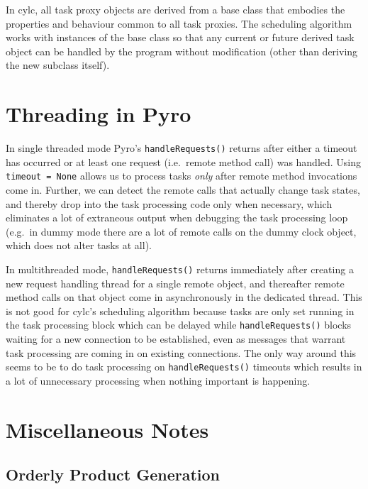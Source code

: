 \documentclass[11pt,a4paper]{article}
\begin{document}
In cylc, all task proxy objects are derived from a base class that 
embodies the properties and behaviour common to all task proxies. 
The scheduling algorithm works with instances of the base class so that
any current or future derived task object can be handled by the program
without modification (other than deriving the new subclass itself).


\pagebreak
\section{Threading in Pyro} \label{pyro-appendix}

In single threaded mode Pyro's \lstinline=handleRequests()= returns
after either a timeout has occurred or at least one request
(i.e.\ remote method call) was handled. Using \lstinline|timeout = None| 
allows us to process tasks {\em only} after remote method invocations
come in.  Further, we can detect the remote calls that actually change
task states, and thereby drop into the task processing code only when
necessary, which eliminates a lot of extraneous output when debugging
the task processing loop (e.g.\ in dummy mode there are a lot of remote
calls on the dummy clock object, which does not alter tasks at all). 

In multithreaded mode, \lstinline=handleRequests()= returns immediately
after creating a new request handling thread for a single remote object,
and thereafter remote method calls on that object come in asynchronously
in the dedicated thread. This is not good for cylc's scheduling
algorithm because tasks are only set running in the task processing
block which can be delayed while \lstinline=handleRequests()= blocks waiting
for a new connection to be established, even as messages that warrant
task processing are coming in on existing connections. The only way
around this seems to be to do task processing on \lstinline=handleRequests()=
timeouts which results in a lot of unnecessary processing when nothing
important is happening.


\pagebreak
\section{Miscellaneous Notes}

\subsection{Orderly Product Generation}
\end{document}
